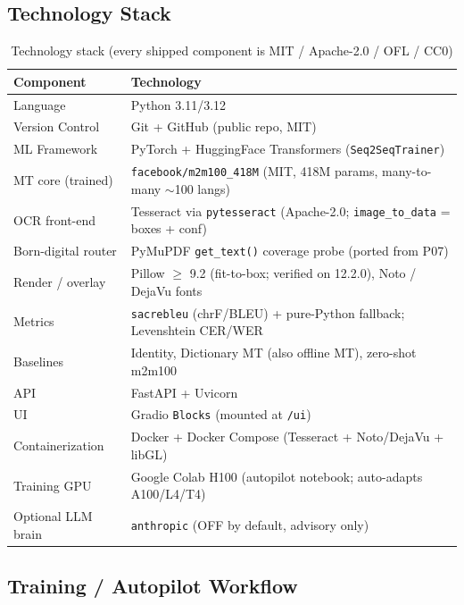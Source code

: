 \documentclass[12pt,a4paper]{article}
\begin{document}
\subsection{Technology Stack}

\begin{table}[H]
\centering
\caption{Technology stack (every shipped component is MIT / Apache-2.0 / OFL / CC0)}
\small
\begin{tabularx}{\linewidth}{@{} l L @{}}
\toprule
\textbf{Component} & \textbf{Technology} \\
\midrule
Language & Python 3.11/3.12 \\
Version Control & Git + GitHub (public repo, MIT) \\
ML Framework & PyTorch + HuggingFace Transformers (\texttt{Seq2SeqTrainer}) \\
MT core (trained) & \texttt{facebook/m2m100\_418M} (MIT, 418M params, many-to-many $\sim$100 langs) \\
OCR front-end & Tesseract via \texttt{pytesseract} (Apache-2.0; \texttt{image\_to\_data} = boxes + conf) \\
Born-digital router & PyMuPDF \texttt{get\_text()} coverage probe (ported from P07) \\
Render / overlay & Pillow $\geq$ 9.2 (fit-to-box; verified on 12.2.0), Noto / DejaVu fonts \\
Metrics & \texttt{sacrebleu} (chrF/BLEU) + pure-Python fallback; Levenshtein CER/WER \\
Baselines & Identity, Dictionary MT (also offline MT), zero-shot m2m100 \\
API & FastAPI + Uvicorn \\
UI & Gradio \texttt{Blocks} (mounted at \texttt{/ui}) \\
Containerization & Docker + Docker Compose (Tesseract + Noto/DejaVu + libGL) \\
Training GPU & Google Colab H100 (autopilot notebook; auto-adapts A100/L4/T4) \\
Optional LLM brain & \texttt{anthropic} (OFF by default, advisory only) \\
\bottomrule
\end{tabularx}
\end{table}

\subsection{Training / Autopilot Workflow}
\label{subsec:workflow}
\end{document}
